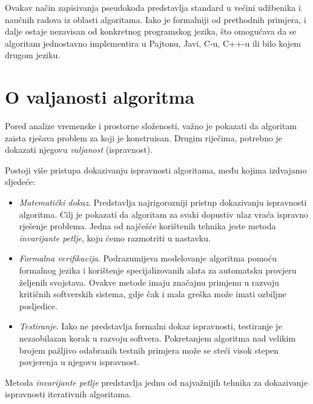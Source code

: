 Ovakav način zapisivanja pseudokoda predstavlja standard u većini udžbenika i naučnih radova iz oblasti algoritama. Iako je formalniji od prethodnih primjera, i dalje ostaje nezavisan od konkretnog programskog jezika, što omogućava da se algoritam jednostavno implementira u Pajtonu, Javi, C-u, C++-u ili bilo kojem drugom jeziku.

\section{O valjanosti algoritma}

Pored analize vremenske i prostorne složenosti, važno je pokazati da algoritam zaista rješava problem za koji je konstruisan. Drugim riječima, potrebno je dokazati njegovu \textit{valjanost} (ispravnost).

Postoji više pristupa dokazivanju ispravnosti algoritama, među kojima izdvajamo sljedeće:

\begin{itemize}
	\item \textit{Matematički dokaz}. Predstavlja najrigorozniji pristup dokazivanju ispravnosti algoritma. Cilj je pokazati da algoritam za svaki dopustiv ulaz vraća ispravno rješenje problema. Jedna od najčešće korištenih tehnika jeste metoda \textit{invarijante petlje}, koju ćemo razmotriti u nastavku.
	
	\item \textit{Formalna verifikacija}. Podrazumijeva modelovanje algoritma pomoću formalnog jezika i korištenje specijalizovanih alata za automatsku provjeru željenih svojstava. Ovakve metode imaju značajnu primjenu u razvoju kritičnih softverskih sistema, gdje čak i mala greška može imati ozbiljne posljedice.
	
	\item \textit{Testiranje}. Iako ne predstavlja formalni dokaz ispravnosti, testiranje je nezaobilazan korak u razvoju softvera. Pokretanjem algoritma nad velikim brojem pažljivo odabranih testnih primjera može se steći visok stepen povjerenja u njegovu ispravnost.
	
\end{itemize}


Metoda \textit{invarijante petlje} predstavlja jednu od najvažnijih tehnika za dokazivanje ispravnosti iterativnih algoritama.

